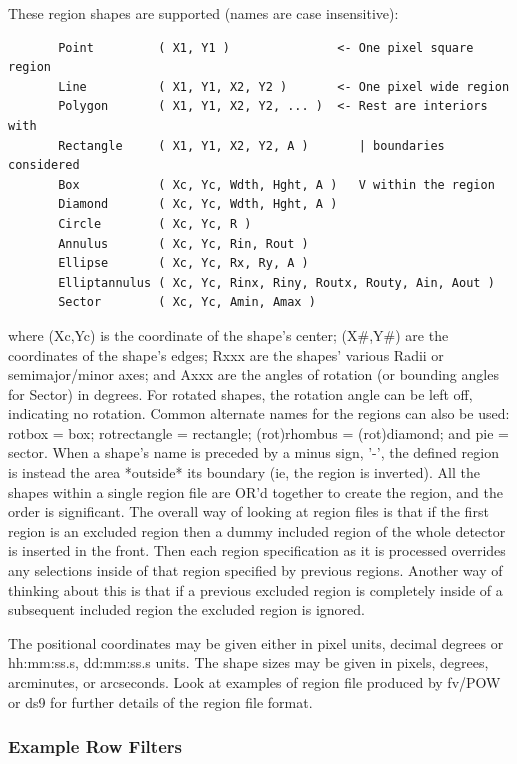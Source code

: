 \documentclass[11pt]{article}
\begin{document}
    These region shapes are supported (names are case insensitive):

\begin{verbatim}
       Point         ( X1, Y1 )               <- One pixel square region
       Line          ( X1, Y1, X2, Y2 )       <- One pixel wide region
       Polygon       ( X1, Y1, X2, Y2, ... )  <- Rest are interiors with
       Rectangle     ( X1, Y1, X2, Y2, A )       | boundaries considered
       Box           ( Xc, Yc, Wdth, Hght, A )   V within the region
       Diamond       ( Xc, Yc, Wdth, Hght, A )
       Circle        ( Xc, Yc, R )
       Annulus       ( Xc, Yc, Rin, Rout )
       Ellipse       ( Xc, Yc, Rx, Ry, A )
       Elliptannulus ( Xc, Yc, Rinx, Riny, Routx, Routy, Ain, Aout )
       Sector        ( Xc, Yc, Amin, Amax )
\end{verbatim}
    where (Xc,Yc) is  the coordinate of  the shape's center; (X\#,Y\#) are
    the coordinates  of the shape's edges;  Rxxx are the shapes' various
    Radii or semimajor/minor  axes; and Axxx  are the angles of rotation
    (or bounding angles for Sector) in degrees.  For rotated shapes, the
    rotation angle  can  be left  off, indicating  no rotation.   Common
    alternate  names for the regions  can also be  used: rotbox = box;
    rotrectangle = rectangle;  (rot)rhombus = (rot)diamond;  and pie
    = sector.  When a  shape's name is  preceded by a minus sign, '-',
    the defined region  is instead the area  *outside* its boundary (ie,
    the region is inverted).  All the shapes within a single region
    file are OR'd together to create the region, and the order is
    significant. The overall way of looking at region files is that if
    the first region is an excluded region then a dummy included region
    of the whole detector is inserted in the front. Then each region
    specification as it is processed overrides any selections inside of
    that region specified by previous regions. Another way of thinking
    about this is that if a previous excluded region is completely
    inside of a subsequent included region the excluded region is
    ignored.

    The positional coordinates may be given either in pixel units,
    decimal degrees or hh:mm:ss.s, dd:mm:ss.s units.  The shape sizes
    may be given in pixels, degrees, arcminutes, or arcseconds.  Look
    at examples of region file produced by fv/POW or ds9 for further
    details of the region file format.

\subsubsection{Example Row Filters}
\end{document}

